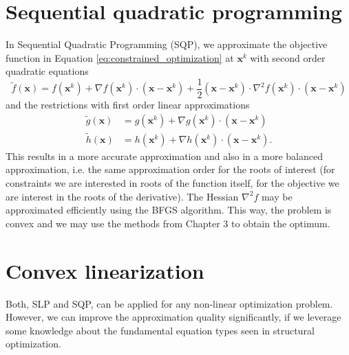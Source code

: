 \section{Sequential quadratic programming}
In Sequential Quadratic Programming (SQP), we approximate the objective function in Equation \eqref{eq:constrained_optimization} at $\mathbf{x}^k$ with second order quadratic equations  
\begin{equation}
    \tilde{f}(\mathbf{x}) = f(\mathbf{x}^k) + \nabla f (\mathbf{x}^k) \cdot \left(\mathbf{x} - \mathbf{x}^k \right) + \frac{1}{2}\left(\mathbf{x} - \mathbf{x}^k \right) \cdot \nabla^2 f(\mathbf{x}^k) \cdot \left(\mathbf{x} - \mathbf{x}^k \right)
\end{equation}
and the restrictions with first order linear approximations
\begin{align}
    \tilde{g}(\mathbf{x}) &= g(\mathbf{x}^k) + \nabla g(\mathbf{x}^k) \cdot \left(\mathbf{x} - \mathbf{x}^k \right) \\
    \tilde{h}(\mathbf{x}) &= h(\mathbf{x}^k) + \nabla h(\mathbf{x}^k) \cdot \left(\mathbf{x} - \mathbf{x}^k \right).
\end{align}
This results in a more accurate approximation and also in a more balanced approximation, i.e. the same approximation order for the roots of interest (for constraints we are interested in roots of the function itself, for the objective we are interest in the roots of the derivative). 
The Hessian $\nabla^2 f$ may be approximated efficiently using the BFGS algorithm. This way, the problem is convex and we may use the methods from Chapter 3 to obtain the optimum. 

\section{Convex linearization}
Both, SLP and SQP, can be applied for any non-linear optimization problem. However, we can improve the approximation quality significantly, if we leverage some knowledge about the fundamental equation types seen in structural optimization.

